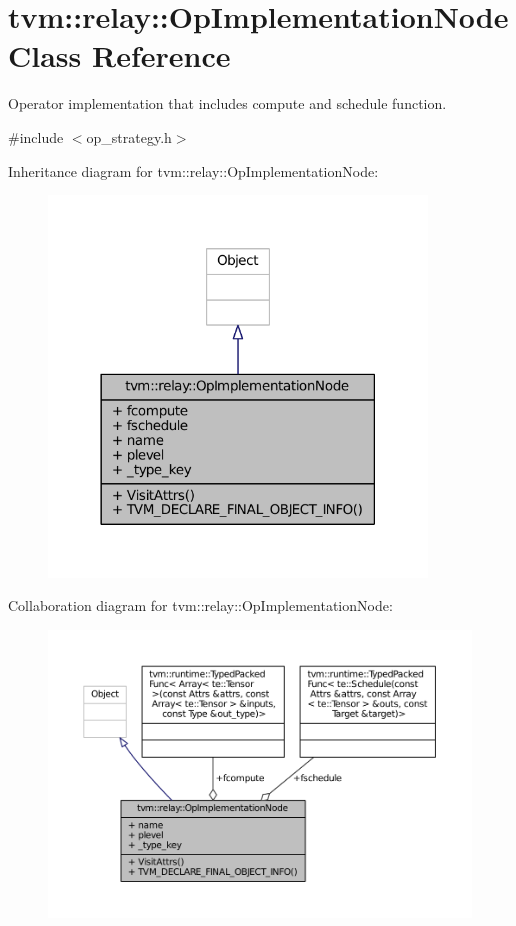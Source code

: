 \hypertarget{classtvm_1_1relay_1_1OpImplementationNode}{}\section{tvm\+:\+:relay\+:\+:Op\+Implementation\+Node Class Reference}
\label{classtvm_1_1relay_1_1OpImplementationNode}


Operator implementation that includes compute and schedule function.  




{\ttfamily \#include $<$op\+\_\+strategy.\+h$>$}



Inheritance diagram for tvm\+:\+:relay\+:\+:Op\+Implementation\+Node\+:
\nopagebreak
\begin{figure}[H]
\begin{center}
\leavevmode
\includegraphics[width=285pt]{classtvm_1_1relay_1_1OpImplementationNode__inherit__graph}
\end{center}
\end{figure}


Collaboration diagram for tvm\+:\+:relay\+:\+:Op\+Implementation\+Node\+:
\nopagebreak
\begin{figure}[H]
\begin{center}
\leavevmode
\includegraphics[width=350pt]{classtvm_1_1relay_1_1OpImplementationNode__coll__graph}
\end{center}
\end{figure}
